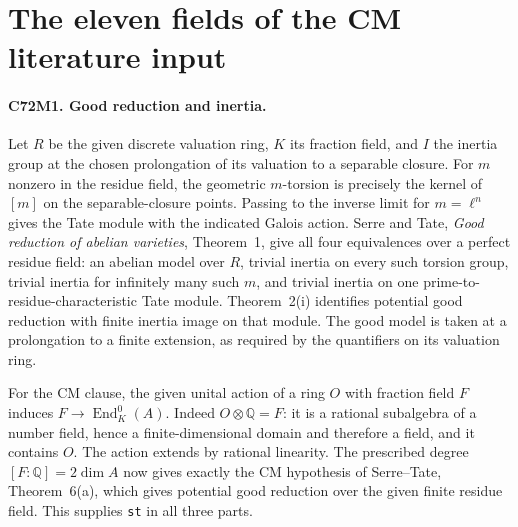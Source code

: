 \section{The eleven fields of the CM literature input}

\paragraph{C72M1. Good reduction and inertia.}
Let $R$ be the given discrete valuation ring, $K$ its fraction field,
and $I$ the inertia group at the chosen prolongation of its valuation to
a separable closure. For $m$ nonzero in the residue field,
the geometric $m$-torsion is precisely the kernel of $[m]$ on
the separable-closure points. Passing to the inverse limit for
$m=\ell^n$ gives the Tate module with the indicated Galois action.
Serre and Tate, \emph{Good reduction of abelian varieties},
Theorem~1, give all four equivalences over a perfect residue field:
an abelian model over $R$, trivial inertia on every such torsion group,
trivial inertia for infinitely many such $m$, and trivial inertia
on one prime-to-residue-characteristic Tate module. Theorem~2(i)
identifies potential good reduction with finite inertia image on that
module. The good model is taken at a prolongation to a finite extension,
as required by the quantifiers on its valuation ring.

For the CM clause, the given unital action of a ring $O$ with fraction
field $F$ induces $F\to\operatorname{End}^0_K(A)$. Indeed
$O\otimes\mathbb Q=F$: it is a rational subalgebra of a number
field, hence a finite-dimensional domain and therefore a field,
and it contains $O$. The action extends by rational linearity.
The prescribed degree $[F:\mathbb Q]=2\dim A$ now gives exactly the
CM hypothesis of Serre--Tate, Theorem~6(a), which gives potential good
reduction over the given finite residue field. This supplies
\texttt{st} in all three parts.

